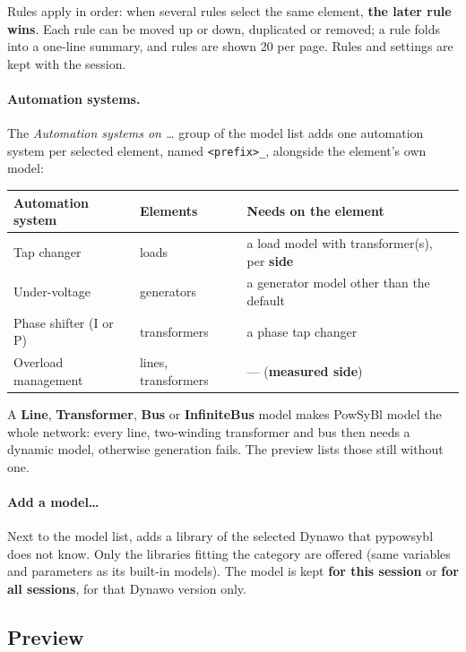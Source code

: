 \documentclass[a4paper,11pt]{article}
\newcommand{\code}[1]{\texttt{\small #1}}
\begin{document}
Rules apply in order: when several rules select the same element, \textbf{the
later rule wins}. Each rule can be moved up or down, duplicated or removed; a
rule folds into a one-line summary, and rules are shown 20 per page. Rules and
settings are kept with the session.

\paragraph{Automation systems.} The \emph{Automation systems on \ldots} group of
the model list adds one automation system per selected element, named
\code{<prefix>\_<element id>}, alongside the element's own model:

\begin{center}
\begin{tabular}{@{}lll@{}}
\toprule
Automation system & Elements & Needs on the element \\
\midrule
Tap changer & loads & a load model with transformer(s), per \textbf{side} \\
Under-voltage & generators & a generator model other than the default \\
Phase shifter (I or P) & transformers & a phase tap changer \\
Overload management & lines, transformers & --- (\textbf{measured side}) \\
\bottomrule
\end{tabular}
\end{center}

\begin{warnbox}
A \textbf{Line}, \textbf{Transformer}, \textbf{Bus} or \textbf{InfiniteBus}
model makes PowSyBl model the whole network: every line, two-winding
transformer and bus then needs a dynamic model, otherwise generation fails.
The preview lists those still without one.
\end{warnbox}

\paragraph{Add a model\ldots} Next to the model list, adds a library of the
selected Dynawo that pypowsybl does not know. Only the libraries fitting the
category are offered (same variables and parameters as its built-in models).
The model is kept \textbf{for this session} or \textbf{for all sessions}, for
that Dynawo version only.

\subsection{Preview}
\end{document}
